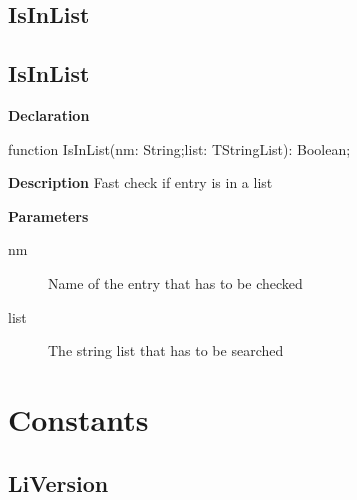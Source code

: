 \documentclass{report}
\newif\ifpdf
\begin{document}
\subsection*{\large{\textbf{IsInList}}\normalsize\hspace{1ex}\hrulefill}
\else
\subsection*{IsInList}
\fi
\label{utilities-IsInList}
\begin{list}{}{
\setlength{\itemindent}{0cm}
\setlength{\listparindent}{0cm}
\setlength{\leftmargin}{\evensidemargin}
\addtolength{\leftmargin}{\tmplength}
\settowidth{\labelsep}{X}
\addtolength{\leftmargin}{\labelsep}
\setlength{\labelwidth}{\tmplength}
}
\item[\textbf{Declaration}\hfill]
\ifpdf
\begin{flushleft}
\fi
\begin{ttfamily}
function IsInList(nm: String;list: TStringList): Boolean;\end{ttfamily}

\ifpdf
\end{flushleft}
\fi

\par
\item[\textbf{Description}]
Fast check if entry is in a list  \par
\item[\textbf{Parameters}]
\begin{description}
\item[nm] Name of the entry that has to be checked
\item[list] The string list that has to be searched
\end{description}


\end{list}
\section{Constants}
\ifpdf
\subsection*{\large{\textbf{LiVersion}}\normalsize\hspace{1ex}\hrulefill}
\else
\end{document}
